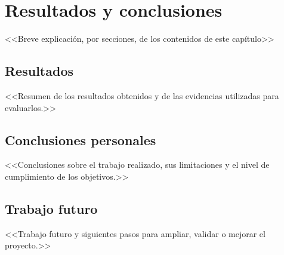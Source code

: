 \chapter{Resultados y conclusiones} \label{chp:resultados}

<<Breve explicación, por secciones, de los contenidos de este capítulo>>


\section{Resultados} \label{sct:resultados_resultados}

<<Resumen de los resultados obtenidos y de las evidencias utilizadas para evaluarlos.>>


\section{Conclusiones personales} \label{sct:resultados_conclusiones}

<<Conclusiones sobre el trabajo realizado, sus limitaciones y el nivel de cumplimiento de los objetivos.>>


\section{Trabajo futuro} \label{sct:resultados_trabajofuturo}

<<Trabajo futuro y siguientes pasos para ampliar, validar o mejorar el proyecto.>>